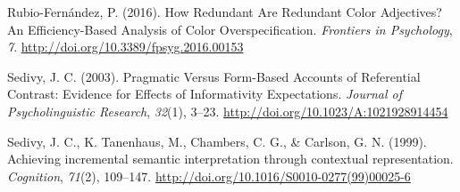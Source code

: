 \documentclass[10pt, letterpaper]{article}
\begin{document}
\hypertarget{ref-rubio-fernandez_how_2016}{}
Rubio-Fernández, P. (2016). How Redundant Are Redundant Color
Adjectives? An Efficiency-Based Analysis of Color Overspecification.
\emph{Frontiers in Psychology}, \emph{7}.
\url{http://doi.org/10.3389/fpsyg.2016.00153}

\hypertarget{ref-sedivy_pragmatic_2003-2}{}
Sedivy, J. C. (2003). Pragmatic Versus Form-Based Accounts of
Referential Contrast: Evidence for Effects of Informativity
Expectations. \emph{Journal of Psycholinguistic Research}, \emph{32}(1),
3--23. \url{http://doi.org/10.1023/A:1021928914454}

\hypertarget{ref-sedivy_achieving_1999}{}
Sedivy, J. C., K. Tanenhaus, M., Chambers, C. G., \& Carlson, G. N.
(1999). Achieving incremental semantic interpretation through contextual
representation. \emph{Cognition}, \emph{71}(2), 109--147.
\url{http://doi.org/10.1016/S0010-0277(99)00025-6}


\end{document}
